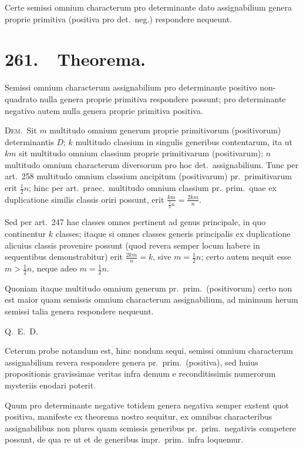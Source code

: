 \documentclass[12pt,a4paper]{article}
\theoremstyle{plain}
\theoremstyle{definition}
\theoremstyle{remark}
\begin{document}
Certe semissi omnium characterum pro determinante dato assignabilium genera proprie primitiva (positiva pro det.\ neg.) respondere nequeunt.

\section*{261.\ \ Theorema.}

Semissi omnium characterum assignabilium pro determinante positivo non-quadrato nulla genera proprie primitiva respondere possunt; pro determinante negativo autem nulla genera proprie primitiva positiva.

\textsc{Dem.}\ Sit $m$ multitudo omnium generum proprie primitivorum (positivorum) determinantis $D$; $k$ multitudo classium in singulis generibus contentarum, ita ut $km$ sit multitudo omnium classium proprie primitivarum (positivarum); $n$ multitudo omnium characterum diversorum pro hoc det.\ assignabilium. Tunc per art.\ 258 multitudo omnium classium ancipitum (positivarum) pr.\ primitivarum erit $\frac{1}{2}n$; hinc per art.\ praec.\ multitudo omnium classium pr.\ prim.\ quae ex duplicatione similis classis oriri possunt, erit $\frac{km}{\frac{1}{2}n} = \frac{2km}{n}$.

Sed per art.\ 247 hae classes omnes pertinent ad genus principale, in quo continentur $k$ classes; itaque si omnes classes generis principalis ex duplicatione alicuius classis provenire possunt (quod revera semper locum habere in sequentibus demonstrabitur) erit $\frac{2km}{n} = k$, sive $m = \frac{1}{2}n$; certo autem nequit esse $m > \frac{1}{2}n$, neque adeo $m = \frac{1}{2}n$.

Quoniam itaque multitudo omnium generum pr.\ prim.\ (positivorum) certo non est maior quam semissis omnium characterum assignabilium, ad minimum herum semissi talia genera respondere nequeunt.

Q.\ E.\ D.

Ceterum probe notandum est, hinc nondum sequi, semissi omnium characterum assignabilium revera respondere genera pr.\ prim.\ (positiva), sed huius propositionis gravissimae veritas infra demum e reconditissimis numerorum mysteriis enodari poterit.

Quum pro determinante negative totidem genera negativa semper exstent quot positiva, manifeste ex theorema nostro sequitur, ex omnibus characteribus assignabilibus non plures quam semissis generibus pr.\ prim.\ negativis competere possunt, de qua re ut et de generibus impr.\ prim.\ infra loquemur.
\end{document}
